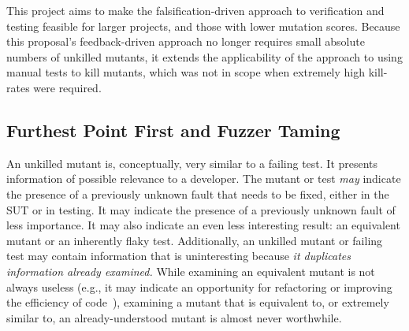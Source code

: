 This project aims to make the falsification-driven approach to verification and testing feasible for larger
projects, and those with lower mutation scores.
Because this proposal's feedback-driven approach no longer requires small absolute numbers of
unkilled mutants, it extends the applicability of the approach
to using manual tests to kill mutants, which was not in
scope when extremely high kill-rates were required.

\subsection{Furthest Point First and Fuzzer Taming}

An unkilled mutant is, conceptually, very similar to a failing test.
It presents information of possible relevance to a developer.  The mutant or test \emph{may} indicate the presence of a
previously unknown fault that needs to be fixed, either in the SUT or in testing.  It may indicate the presence of a previously unknown fault
of less importance.  It may also indicate an even less interesting
result:  an equivalent mutant or 
an inherently flaky test.  Additionally, an unkilled
mutant or failing test may contain information that is uninteresting because \emph{it
  duplicates information already examined.}  While
examining an equivalent mutant is not always useless (e.g., it may indicate
an opportunity for refactoring or improving the efficiency of code~\cite{ivankovic2018industrial,groce2018verified}), examining a mutant that is
equivalent to, or extremely similar to, an already-understood mutant is almost never
worthwhile.  %

